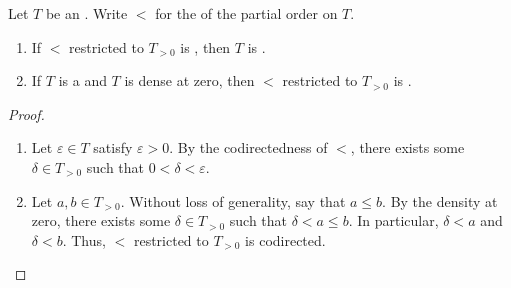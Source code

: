 \begin{lemma} \label{lemma:ordered_monoid_with_codirected_strict_partial_order_on_positives_is_dense_at_zero_and_totally_ordered_monoid_that_is_dense_at_zero_has_strict_partial_order_that_is_codirected}
    Let $T$ be an . Write $<$ for the  of the partial order on $T$.
    \begin{enumerate}
        \item If $<$ restricted to $T_{>0}$ is , then $T$ is . 

        \item If $T$ is a  and $T$ is dense at zero, then $<$ restricted to $T_{>0}$ is .
    \end{enumerate}
\end{lemma}
\begin{proof}
    \begin{enumerate}
        \item Let $\varepsilon \in T$ satisfy $\varepsilon > 0$. By the codirectedness of $<$, there exists some $\delta \in T_{>0}$ such that $0 < \delta < \varepsilon$. 

        \item Let $a,b \in T_{>0}$. Without loss of generality, say that $a \leq b$. By the density at zero, there exists some $\delta \in T_{>0}$ such that $\delta < a \leq b$. In particular, $\delta < a$ and $\delta < b$. Thus, $<$ restricted to $T_{>0}$ is codirected. 
    \end{enumerate}

\end{proof}